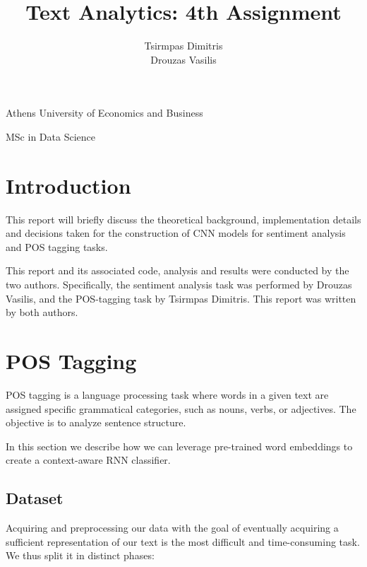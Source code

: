\documentclass[10pt, a4paper]{article}
\title{\Huge Text Analytics: 4th Assignment}
\author{\LARGE Tsirmpas Dimitris\\\LARGE Drouzas Vasilis}
\begin{document}
	
	\begin{titlepage}
		\maketitle
		\begin{center}
			
			\large Athens University of Economics and Business
			
			\large MSc in Data Science
			
		\end{center}
		
	\end{titlepage}
	
	\tableofcontents
	\newpage	
	
	\section{Introduction}
	
	This report will briefly discuss the theoretical background, implementation details and decisions taken for the construction of CNN models for sentiment analysis and POS tagging tasks.
	
	This report and its associated code, analysis and results were conducted by the two authors. Specifically, the sentiment analysis task was performed by Drouzas Vasilis, and the POS-tagging task by Tsirmpas Dimitris. This report was written by both authors.
	
	
	\section{POS Tagging}
	
	POS tagging is a language processing task where words in a given text are assigned specific grammatical categories, such as nouns, verbs, or adjectives. The objective is to analyze sentence structure. 
	
	In this section we describe how we can leverage pre-trained word embeddings to create a context-aware RNN classifier.
	
	
	\subsection{Dataset}
	
	Acquiring and preprocessing our data with the goal of eventually acquiring a sufficient representation of our text is the most difficult and time-consuming task. We thus split it in distinct phases:
	
\end{document}
